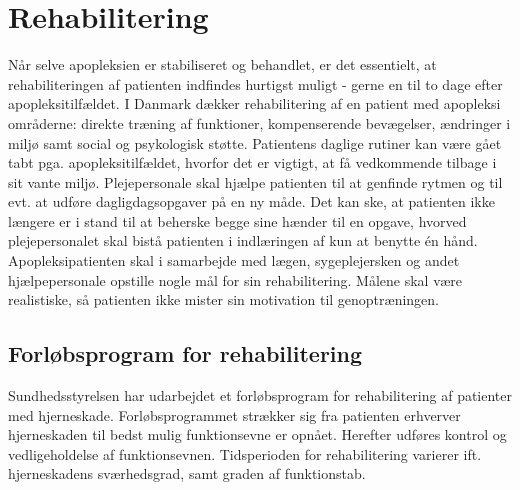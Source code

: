 \section{Rehabilitering}\label{Rehabilitering}
Når selve apopleksien er stabiliseret og behandlet, er det essentielt, at rehabiliteringen af patienten indfindes hurtigst muligt - gerne en til to dage efter apopleksitilfældet. I Danmark dækker rehabilitering af en patient med apopleksi områderne: direkte træning af funktioner, kompenserende bevægelser, ændringer i miljø samt social og psykologisk støtte. Patientens daglige rutiner kan være gået tabt pga. apopleksitilfældet, hvorfor det er vigtigt, at få vedkommende tilbage i sit vante miljø. Plejepersonale skal hjælpe patienten til at genfinde rytmen og til evt. at udføre dagligdagsopgaver på en ny måde. Det kan ske, at patienten ikke længere er i stand til at beherske begge sine hænder til en opgave, hvorved plejepersonalet skal bistå patienten i indlæringen af kun at benytte én hånd. \cite{Kruuse2015} \\
Apopleksipatienten skal i samarbejde med lægen, sygeplejersken og andet hjælpepersonale opstille nogle mål for sin rehabilitering. Målene skal være realistiske, så patienten ikke mister sin motivation til genoptræningen. \cite{Kruuse2015}

\subsection{Forløbsprogram for rehabilitering}\label{Faser}
Sundhedsstyrelsen har udarbejdet et forløbsprogram for rehabilitering af patienter med hjerneskade. Forløbsprogrammet strækker sig fra patienten erhverver hjerneskaden til bedst mulig funktionsevne er opnået. Herefter udføres kontrol og vedligeholdelse af funktionsevnen. Tidsperioden for rehabilitering varierer ift. hjerneskadens sværhedsgrad, samt graden af funktionstab. %
\cite{Sundhedsstyrelsen2011a}

